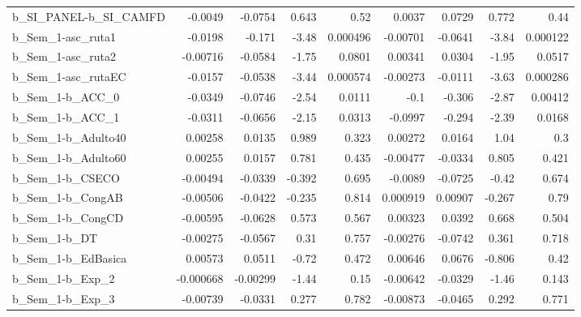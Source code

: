 \begin{tabular}{lrrrrrrrr}
b\_SI\_PANEL-b\_SI\_CAMFD      &     -0.0049 &      -0.0754 &    0.643 &     0.52 &     0.0037 &      0.0729 &        0.772 &          0.44 \\
b\_Sem\_1-asc\_ruta1          &     -0.0198 &       -0.171 &    -3.48 & 0.000496 &   -0.00701 &     -0.0641 &        -3.84 &      0.000122 \\
b\_Sem\_1-asc\_ruta2          &    -0.00716 &      -0.0584 &    -1.75 &   0.0801 &    0.00341 &      0.0304 &        -1.95 &        0.0517 \\
b\_Sem\_1-asc\_rutaEC         &     -0.0157 &      -0.0538 &    -3.44 & 0.000574 &   -0.00273 &     -0.0111 &        -3.63 &      0.000286 \\
b\_Sem\_1-b\_ACC\_0            &     -0.0349 &      -0.0746 &    -2.54 &   0.0111 &       -0.1 &      -0.306 &        -2.87 &       0.00412 \\
b\_Sem\_1-b\_ACC\_1            &     -0.0311 &      -0.0656 &    -2.15 &   0.0313 &    -0.0997 &      -0.294 &        -2.39 &        0.0168 \\
b\_Sem\_1-b\_Adulto40         &     0.00258 &       0.0135 &    0.989 &    0.323 &    0.00272 &      0.0164 &         1.04 &           0.3 \\
b\_Sem\_1-b\_Adulto60         &     0.00255 &       0.0157 &    0.781 &    0.435 &   -0.00477 &     -0.0334 &        0.805 &         0.421 \\
b\_Sem\_1-b\_CSECO            &    -0.00494 &      -0.0339 &   -0.392 &    0.695 &    -0.0089 &     -0.0725 &        -0.42 &         0.674 \\
b\_Sem\_1-b\_CongAB           &    -0.00506 &      -0.0422 &   -0.235 &    0.814 &   0.000919 &     0.00907 &       -0.267 &          0.79 \\
b\_Sem\_1-b\_CongCD           &    -0.00595 &      -0.0628 &    0.573 &    0.567 &    0.00323 &      0.0392 &        0.668 &         0.504 \\
b\_Sem\_1-b\_DT               &    -0.00275 &      -0.0567 &     0.31 &    0.757 &   -0.00276 &     -0.0742 &        0.361 &         0.718 \\
b\_Sem\_1-b\_EdBasica         &     0.00573 &       0.0511 &    -0.72 &    0.472 &    0.00646 &      0.0676 &       -0.806 &          0.42 \\
b\_Sem\_1-b\_Exp\_2            &   -0.000668 &     -0.00299 &    -1.44 &     0.15 &   -0.00642 &     -0.0329 &        -1.46 &         0.143 \\
b\_Sem\_1-b\_Exp\_3            &    -0.00739 &      -0.0331 &    0.277 &    0.782 &   -0.00873 &     -0.0465 &        0.292 &         0.771 \\

\end{tabular}
